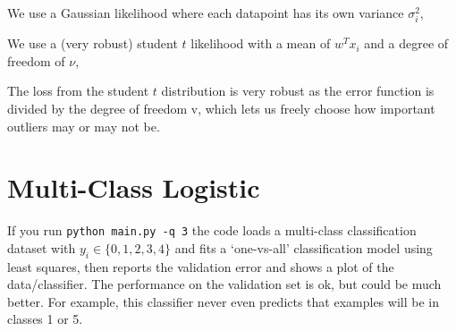 \documentclass{article}
\begin{document}
{{}
\item {We use a Gaussian likelihood where each datapoint has its own variance $\sigma_i^2$,
\newline{\[
p(y_i | x_i,w) = \frac{1}{\sqrt{2\sigma_i^2\pi}}\exp\left(-\frac{(w^Tx_i - y_i)^2}{2\sigma_i^2}\right).
\]}
}
\item {We use a (very robust) student $t$ likelihood with a mean of $w^Tx_i$ and a degree of freedom of $\nu$,
}
}

The loss from the student $t$ distribution is very robust as the error function is divided by the degree of freedom v, which lets us freely choose how important outliers may or may not be.

\section{Multi-Class Logistic}

If you run \verb|python main.py -q 3| the code loads a multi-class classification dataset with $y_i \in \{0,1,2,3,4\}$ and fits a `one-vs-all' classification model using least squares, then reports the validation error and shows a plot of the data/classifier. The performance on the validation set is ok, but could be much better. For example, this classifier never even predicts that examples will be in classes 1 or 5.
\end{document}
